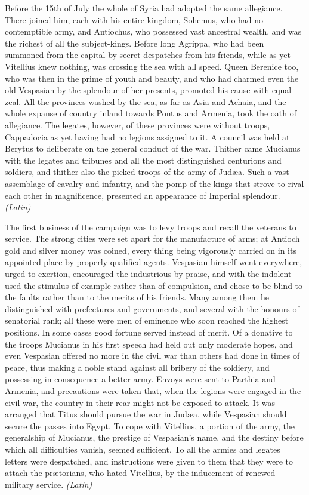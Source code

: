 Before the 15th of July the whole of Syria had adopted the same allegiance. There joined him, each with his entire kingdom, Sohemus, who had no contemptible army, and Antiochus, who possessed vast ancestral wealth, and was the richest of all the subject-kings. Before long Agrippa, who had been summoned from the capital by secret despatches from his friends, while as yet Vitellius knew nothing, was crossing the sea with all speed. Queen Berenice too, who was then in the prime of youth and beauty, and who had charmed even the old Vespasian by the splendour of her presents, promoted his cause with equal zeal. All the provinces washed by the sea, as far as Asia and Achaia, and the whole expanse of country inland towards Pontus and Armenia, took the oath of allegiance. The legates, however, of these provinces were without troops, Cappadocia as yet having had no legions assigned to it. A council was held at Berytus to deliberate on the general conduct of the war. Thither came Mucianus with the legates and tribunes and all the most distinguished centurions and soldiers, and thither also the picked troops of the army of Judæa. Such a vast assemblage of cavalry and infantry, and the pomp of the kings that strove to rival each other in magnificence, presented an appearance of Imperial splendour. \emph{(Latin)}


The first business of the campaign was to levy troops and recall the veterans to service. The strong cities were set apart for the manufacture of arms; at Antioch gold and silver money was coined, every thing being vigorously carried on in its appointed place by properly qualified agents. Vespasian himself went everywhere, urged to exertion, encouraged the industrious by praise, and with the indolent used the stimulus of example rather than of compulsion, and chose to be blind to the faults rather than to the merits of his friends. Many among them he distinguished with prefectures and governments, and several with the honours of senatorial rank; all these were men of eminence who soon reached the highest positions. In some cases good fortune served instead of merit. Of a donative to the troops Mucianus in his first speech had held out only moderate hopes, and even Vespasian offered no more in the civil war than others had done in times of peace, thus making a noble stand against all bribery of the soldiery, and possessing in consequence a better army. Envoys were sent to Parthia and Armenia, and precautions were taken that, when the legions were engaged in the civil war, the country in their rear might not be exposed to attack. It was arranged that Titus should pursue the war in Judæa, while Vespasian should secure the passes into Egypt. To cope with Vitellius, a portion of the army, the generalship of Mucianus, the prestige of Vespasian's name, and the destiny before which all difficulties vanish, seemed sufficient. To all the armies and legates letters were despatched, and instructions were given to them that they were to attach the prætorians, who hated Vitellius, by the inducement of renewed military service. \emph{(Latin)}

